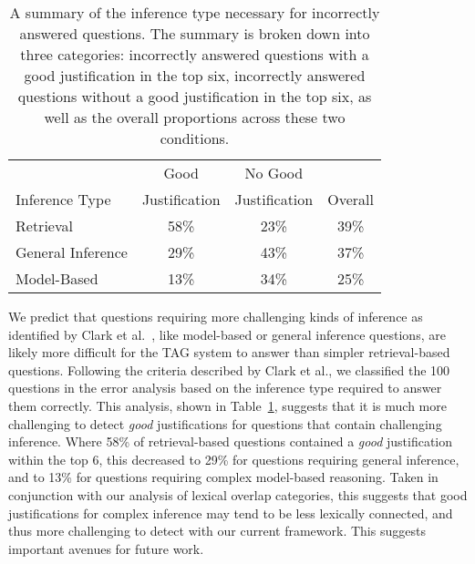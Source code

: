 %
%
\begin{table}[t]

\caption{{  A summary of the inference type necessary for incorrectly answered questions.  The summary is broken down into three categories: incorrectly answered questions with a good justification in the top six, incorrectly answered questions without a good justification in the top six, as well as the overall proportions across these two conditions. }} 
\small
\begin{center}
\begin{tabular}{lccc}

\hline
\multicolumn{1}{c}{} & \multicolumn{1}{c}{Good} &\multicolumn{1}{c}{No Good} & \multicolumn{1}{c}{}  \\
\multicolumn{1}{l}{Inference Type} & \multicolumn{1}{c}{Justification} &\multicolumn{1}{c}{Justification} & \multicolumn{1}{c}{Overall}  \\

\hline
Retrieval 			& 58\%		&	23\%		& 39\%	\\
General Inference	& 29\%		&	43\%		& 37\%	\\
Model-Based			& 13\%		&	34\%		& 25\%	\\
\hline
\end{tabular}
\label{tab:knowledgetype}
\end{center}
\end{table}

{}
We predict that questions requiring more challenging kinds of inference as identified by Clark et al.~\citeyear{clark:2013}, like model-based or general inference questions, are likely more difficult for the TAG system to answer than simpler retrieval-based questions. 
Following the criteria described by Clark et al., we classified the 100 questions in the error analysis based on the inference type required to answer them correctly. 
This analysis, shown in Table~\ref{tab:knowledgetype}, suggests that it is much more challenging to detect \emph{good} justifications for questions that contain challenging inference.  Where 58\% of retrieval-based questions contained a \emph{good} justification within the top 6, this decreased to 29\% for questions requiring general inference, and to 13\% for questions requiring complex model-based reasoning.  Taken in conjunction with our analysis of lexical overlap categories, this suggests that good justifications for complex inference may tend to be less lexically connected, and thus more challenging to detect with our current framework. This suggests important avenues for future work.

